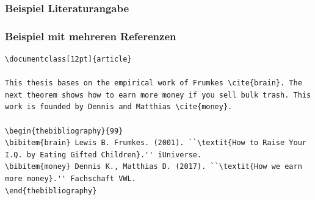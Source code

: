 \begin{frame}[fragile]
\frametitle{Beispiel Literaturangabe}
\end{frame}


\begin{frame}[fragile,t]
\frametitle{Beispiel mit mehreren Referenzen}
\begin{lstlisting}[style=Latex]
\documentclass[12pt]{article}

This thesis bases on the empirical work of Frumkes \cite{brain}. The next theorem shows how to earn more money if you sell bulk trash. This work is founded by Dennis and Matthias \cite{money}.

\begin{thebibliography}{99}
\bibitem{brain} Lewis B. Frumkes. (2001). ``\textit{How to Raise Your I.Q. by Eating Gifted Children}.'' iUniverse.
\bibitem{money} Dennis K., Matthias D. (2017). ``\textit{How we earn more money}.'' Fachschaft VWL.
\end{thebibliography}

\end{lstlisting}
\end{frame}

